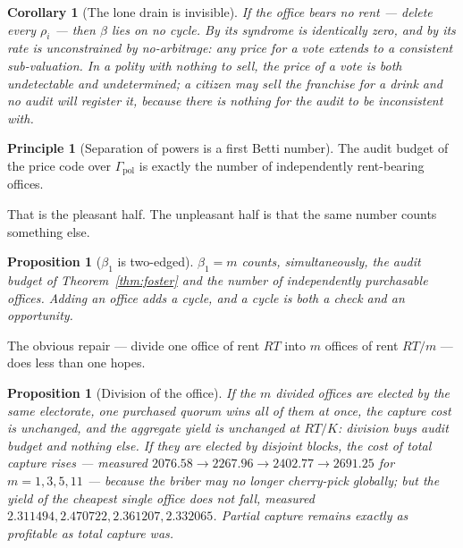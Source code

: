 \documentclass[11pt]{article}
\theoremstyle{plain}
\newtheorem{proposition}[theorem]{Proposition}
\newtheorem{corollary}[theorem]{Corollary}
\theoremstyle{definition}
\newtheorem{principle}[theorem]{Principle}
\theoremstyle{remark}
\newcommand{\bt}{\beta_1}
\begin{document}
\begin{corollary}[The lone drain is invisible]
\label{cor:drain}
If the office bears no rent --- delete every $\rho_i$ --- then $\beta$ lies on
no cycle. By \cite[Thm.~5.3]{engine} its syndrome is identically zero, and by
\cite[Cor.~5.6]{engine} its rate is unconstrained by no-arbitrage: any price for
a vote extends to a consistent sub-valuation. In a polity with nothing to sell,
the price of a vote is both undetectable and undetermined; a citizen may sell
the franchise for a drink and no audit will register it, because there is
nothing for the audit to be inconsistent \emph{with}.
\end{corollary}

\begin{principle}[Separation of powers is a first Betti number]
\label{prin:powers}
The audit budget of the price code over $\Gamma_{\mathrm{pol}}$ is exactly the
number of independently rent-bearing offices.
\end{principle}

That is the pleasant half. The unpleasant half is that the same number counts
something else.

\begin{proposition}[$\bt$ is two-edged]
\label{prop:twoedged}
$\bt = m$ counts, simultaneously, the audit budget of
Theorem~\ref{thm:foster} and the number of independently purchasable offices.
Adding an office adds a cycle, and a cycle is both a check and an opportunity.
\end{proposition}

The obvious repair --- divide one office of rent $RT$ into $m$ offices of rent
$RT/m$ --- does less than one hopes.

\begin{proposition}[Division of the office]
\label{prop:division}
If the $m$ divided offices are elected by the \emph{same} electorate, one
purchased quorum wins all of them at once, the capture cost is unchanged, and
the aggregate yield is unchanged at $RT/K$: division buys audit budget and
nothing else. If they are elected by \emph{disjoint} blocks, the cost of total
capture rises --- measured $2076.58 \to 2267.96 \to 2402.77 \to 2691.25$ for
$m = 1,3,5,11$ --- because the briber may no longer cherry-pick globally; but
the yield of the \emph{cheapest single office} does not fall, measured
$2.311494, 2.470722, 2.361207, 2.332065$. Partial capture remains exactly as
profitable as total capture was.
\end{proposition}
\end{document}
